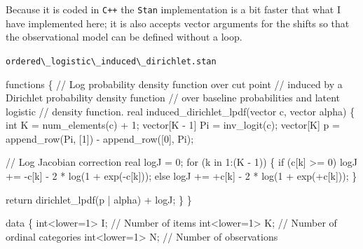 \documentclass[
  letterpaper,
  DIV=11,
  numbers=noendperiod]{scrartcl}
\newenvironment{Shaded}{\begin{snugshade}}{\end{snugshade}}
\newcommand{\CommentTok}[1]{\textcolor[rgb]{0.37,0.37,0.37}{#1}}
\newcommand{\ControlFlowTok}[1]{\textcolor[rgb]{0.00,0.23,0.31}{#1}}
\newcommand{\DataTypeTok}[1]{\textcolor[rgb]{0.68,0.00,0.00}{#1}}
\newcommand{\DecValTok}[1]{\textcolor[rgb]{0.68,0.00,0.00}{#1}}
\newcommand{\KeywordTok}[1]{\textcolor[rgb]{0.00,0.23,0.31}{#1}}
\newcommand{\NormalTok}[1]{\textcolor[rgb]{0.00,0.23,0.31}{#1}}
\begin{document}
Because it is coded in \texttt{C++} the \texttt{Stan} implementation is
a bit faster that what I have implemented here; it is also accepts
vector arguments for the shifts so that the observational model can be
defined without a loop.

\begin{codelisting}

\caption{\texttt{ordered\textbackslash\_logistic\textbackslash\_induced\textbackslash\_dirichlet.stan}}

\begin{Shaded}
\begin{Highlighting}[]
\KeywordTok{functions}\NormalTok{ \{}
  \CommentTok{// Log probability density function over cut point}
  \CommentTok{// induced by a Dirichlet probability density function}
  \CommentTok{// over baseline probabilities and latent logistic}
  \CommentTok{// density function.}
  \DataTypeTok{real}\NormalTok{ induced\_dirichlet\_lpdf(}\DataTypeTok{vector}\NormalTok{ c, }\DataTypeTok{vector}\NormalTok{ alpha) \{}
    \DataTypeTok{int}\NormalTok{ K = num\_elements(c) + }\DecValTok{1}\NormalTok{;}
    \DataTypeTok{vector}\NormalTok{[K {-} }\DecValTok{1}\NormalTok{] Pi = inv\_logit(c);}
    \DataTypeTok{vector}\NormalTok{[K] p = append\_row(Pi, [}\DecValTok{1}\NormalTok{]\textquotesingle{}) {-} append\_row([}\DecValTok{0}\NormalTok{]\textquotesingle{}, Pi);}

    \CommentTok{// Log Jacobian correction}
    \DataTypeTok{real}\NormalTok{ logJ = }\DecValTok{0}\NormalTok{;}
    \ControlFlowTok{for}\NormalTok{ (k }\ControlFlowTok{in} \DecValTok{1}\NormalTok{:(K {-} }\DecValTok{1}\NormalTok{)) \{}
      \ControlFlowTok{if}\NormalTok{ (c[k] \textgreater{}= }\DecValTok{0}\NormalTok{)}
\NormalTok{        logJ += {-}c[k] {-} }\DecValTok{2}\NormalTok{ * log(}\DecValTok{1}\NormalTok{ + exp({-}c[k]));}
      \ControlFlowTok{else}
\NormalTok{        logJ += +c[k] {-} }\DecValTok{2}\NormalTok{ * log(}\DecValTok{1}\NormalTok{ + exp(+c[k]));}
\NormalTok{    \}}

    \ControlFlowTok{return}\NormalTok{ dirichlet\_lpdf(p | alpha) + logJ;}
\NormalTok{  \}}
\NormalTok{\}}

\KeywordTok{data}\NormalTok{ \{}
  \DataTypeTok{int}\NormalTok{\textless{}}\KeywordTok{lower}\NormalTok{=}\DecValTok{1}\NormalTok{\textgreater{} I;                   }\CommentTok{// Number of items}
  \DataTypeTok{int}\NormalTok{\textless{}}\KeywordTok{lower}\NormalTok{=}\DecValTok{1}\NormalTok{\textgreater{} K;                   }\CommentTok{// Number of ordinal categories}
  \DataTypeTok{int}\NormalTok{\textless{}}\KeywordTok{lower}\NormalTok{=}\DecValTok{1}\NormalTok{\textgreater{} N;                   }\CommentTok{// Number of observations}


\end{Highlighting}
\end{Shaded}
\end{codelisting}
\end{document}
